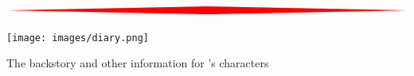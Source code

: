 
\begin{titlepage}
    \begin{onecolumn}
        \begin{center}
            {\Huge \booktitle}

            \vspace{0.5cm}
            \includegraphics[width=\textwidth]{images/hr.png}

            \vspace{0.5cm}
            {\huge \booksubtitle}

            \vspace{0.5cm}

            \texttt{[image: images/diary.png]}

            \vspace{0.5cm}

            \vspace{0.5cm}
            {\Large The backstory and other information for \bookauthor{}'s characters}


            \vfill
            {\Large \tagline}

        \end{center}
    \end{onecolumn}
\end{titlepage}
\clearpage

\setcounter{tocdepth}{2} %
\tableofcontents
\vfill
\clearpage